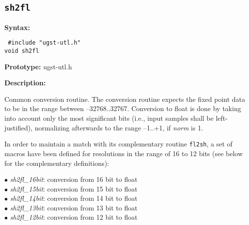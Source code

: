 \subsection{{\tt sh2fl}}

{\bf Syntax: }

{\tt
\#include "ugst-utl.h"\\
void sh2fl
}

{\bf Prototype: }    ugst-utl.h

{\bf Description: }

Common conversion routine. The conversion routine expects the fixed
point data to be in the range between --32768..32767. Conversion to
float is done by taking into account only the most significant bits
(i.e., input samples shall be left-justified), normalizing afterwards to
the range --1..+1, if {\em norm} is 1.

In order to maintain a match with its complementary routine {\tt fl2sh},
a set of macros have been defined for resolutions in the range of 16 to
12 bits (see below for the complementary definitions):

\begin{minipage}{140mm}
  $\bullet$  {\em sh2fl\_16bit}: conversion from 16 bit to float\\
  $\bullet$  {\em sh2fl\_15bit}: conversion from 15 bit to float\\
  $\bullet$  {\em sh2fl\_14bit}: conversion from 14 bit to float\\
  $\bullet$  {\em sh2fl\_13bit}: conversion from 13 bit to float\\
  $\bullet$  {\em sh2fl\_12bit}: conversion from 12 bit to float\\
\end{minipage}


